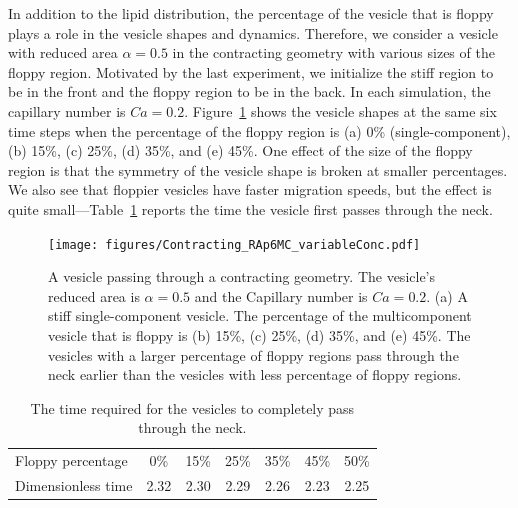 \documentclass[twoside,twocolumn,9pt]{article}
\begin{document}
In addition to the lipid distribution, the percentage of the vesicle
that is floppy plays a role in the vesicle shapes and dynamics.
Therefore, we consider a vesicle with reduced area $\alpha = 0.5$ in the
contracting geometry with various sizes of the floppy region. Motivated
by the last experiment, we initialize the stiff region to be in the
front and the floppy region to be in the back. In each simulation, the
capillary number is $Ca = 0.2$. Figure~\ref{fig:RA5} shows the vesicle
shapes at the same six time steps when the percentage of the floppy
region is (a) 0\% (single-component), (b) 15\%, (c) 25\%, (d) 35\%, and
(e) 45\%. One effect of the size of the floppy region is that the
symmetry of the vesicle shape is broken at smaller percentages. We also
see that floppier vesicles have faster migration speeds, but the effect
is quite small---Table~\ref{tbl:contractingTimes} reports the time the
vesicle first passes through the neck. 

\begin{figure}[h]
  \centering
  \texttt{[image: figures/Contracting\_RAp6MC\_variableConc.pdf]}
  \caption{\label{fig:RA5} \small A vesicle passing through a
  contracting geometry. The vesicle's reduced area is $\alpha = 0.5$ and
  the Capillary number is $Ca = 0.2$. (a) A stiff single-component
  vesicle. The percentage of the multicomponent vesicle that is floppy
  is (b) 15\%, (c) 25\%, (d) 35\%, and (e) 45\%. The vesicles with a
  larger percentage of floppy regions pass through the neck earlier than
  the vesicles with less percentage of floppy regions.}
\end{figure}

\begin{table}[h]
  \centering
  \begin{tabular}{l|cccccc}
    \hline
    Floppy percentage & 0\% & 15\% & 25\% & 35\% & 45\% & 50\% \\ 
    Dimensionless time & 2.32 & 2.30 & 2.29 & 2.26 & 2.23 & 2.25\\
    \hline
  \end{tabular}
  \caption{\label{tbl:contractingTimes} \small The time required for the
  vesicles to completely pass through the neck.}
\end{table}
\end{document}
